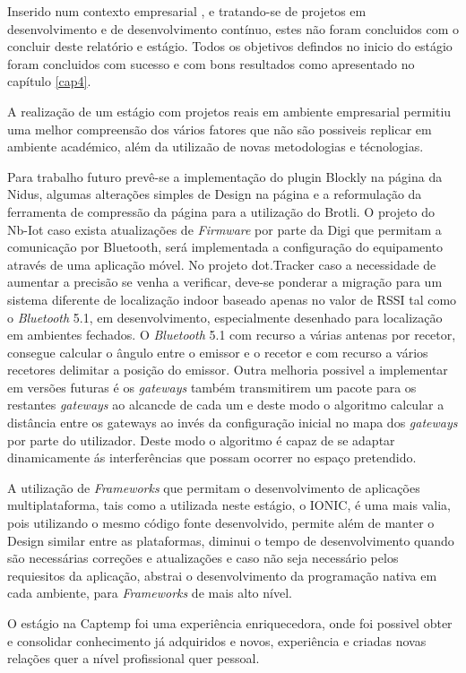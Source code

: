 \par Inserido num contexto empresarial , e tratando-se de projetos em desenvolvimento e de desenvolvimento contínuo, estes não foram concluidos com o concluir deste relatório e estágio. Todos os objetivos defindos no inicio do estágio foram concluidos com sucesso e com bons resultados como apresentado no capítulo \ref{cap4}. 
\par A realização de um estágio com projetos reais em ambiente empresarial permitiu uma melhor compreensão dos vários fatores que  não são possiveis replicar em ambiente académico, além da utilizaão de novas metodologias e técnologias.

\par Para trabalho futuro prevê-se a implementação do plugin Blockly na página da Nidus, algumas alterações simples de Design na página e a reformulação da ferramenta de compressão da página para a utilização do Brotli.
O projeto do Nb-Iot caso exista atualizações de \textit{Firmware} por parte da Digi que permitam a comunicação por Bluetooth, será implementada a configuração do equipamento através de uma aplicação móvel. No projeto dot.Tracker caso a necessidade de aumentar a precisão se venha a verificar, deve-se ponderar a migração para um sistema diferente de localização indoor baseado apenas no valor de RSSI tal como o \textit{Bluetooth} 5.1, em desenvolvimento, especialmente desenhado para localização em ambientes fechados. O \textit{Bluetooth} 5.1 com recurso a várias antenas por recetor, consegue calcular o ângulo entre o emissor e o recetor e com recurso a vários recetores delimitar a posição do emissor. Outra melhoria possivel a implementar em versões futuras é os \textit{gateways} também transmitirem um pacote para os restantes \textit{gateways} ao alcancde de cada um e deste modo o algoritmo calcular a distância entre os gateways ao invés da configuração inicial no mapa dos \textit{gateways} por parte do utilizador. Deste modo o algoritmo é capaz de se adaptar dinamicamente ás interferências que possam ocorrer no espaço pretendido.

\par A utilização de \textit{Frameworks} que permitam o desenvolvimento de aplicações multiplataforma, tais como a utilizada neste estágio, o IONIC, é uma mais valia, pois utilizando o mesmo código fonte desenvolvido, permite além de manter o Design similar entre as plataformas, diminui o tempo de desenvolvimento quando são necessárias correções e atualizações e caso não seja necessário pelos requiesitos da aplicação, abstrai o desenvolvimento da programação nativa em cada ambiente, para \textit{Frameworks} de mais alto nível.

\par O estágio na Captemp foi uma experiência enriquecedora, onde foi possivel obter e consolidar conhecimento já adquiridos e novos, experiência e criadas novas relações quer a nível profissional quer pessoal.